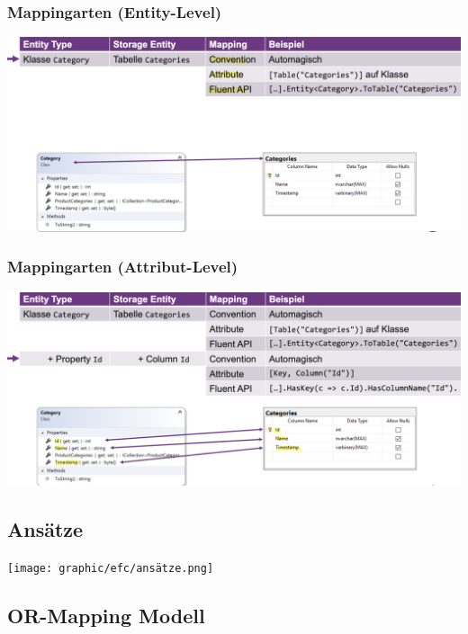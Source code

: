 \subsubsection{Mappingarten (Entity-Level)}
\begin{center}
    \includegraphics[scale=.32]{graphic/efc/Entity-Level.png}
\end{center}
\vspace{-8pt}

\subsubsection{Mappingarten (Attribut-Level)}
\begin{center}
    \includegraphics[scale=.32]{graphic/efc/Attribut-Level.png}
\end{center}
\vspace{-8pt}

\subsection{Ansätze}
\begin{center}
    \texttt{[image: graphic/efc/ansätze.png]}
\end{center}
\vspace{-8pt}


\subsection{OR-Mapping Modell}
